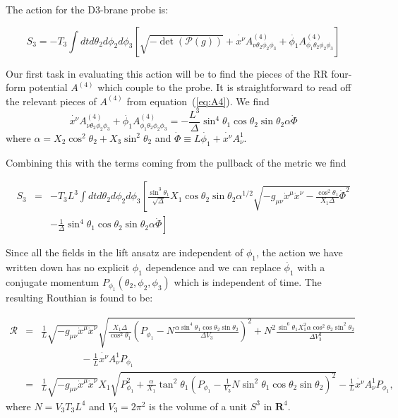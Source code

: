 \documentclass[a4paper,12pt]{article}
\begin{document}
The action for the D3-brane probe is:

\begin{equation}
  S_3  =  -T_3 \int dt d\theta_2 d\phi_2 d\phi_3 \left[  \sqrt{-\det(\mathcal{P}(g))}           + \dot{x^{\nu}} A^{(4)}_{\nu \theta_2 \phi_2 \phi_3}  +  \dot{\phi_1} A^{(4)}_{\phi_1 \theta_2 \phi_2 \phi_3}\right]
 \label{eq: Probeaction}
\end{equation}

Our first task in evaluating this action will be to find the pieces of the RR four-form potential $A^{(4)}$ which couple to the probe.
It is straightforward to read off the relevant pieces of $A^{(4)}$ from equation~(\ref{eq:A4}). We find 
\begin{equation}
   \dot{x^{\nu}} A^{(4)}_{\nu \theta_2 \phi_2 \phi_3}  +  \dot{\phi_1} A^{(4)}_{\phi_1 \theta_2 \phi_2 \phi_3} = - \frac{L^3}{\Delta} \sin^4 \theta_1 \cos \theta_2 \sin \theta_2 \alpha \dot{\Phi}
\end{equation}
where $\alpha =  X_2 \cos ^2 \theta_2 +  X_3 \sin^2 \theta_2$ and
$\dot{{\Phi}} \equiv L\dot{\phi_1} + \dot{x^{\nu}} A_{\nu}^1$.

Combining this with the terms coming from the pullback of the metric we find

\begin{eqnarray}
  S_3  &=&  -T_3 L^3 \int dt d\theta_2 d\phi_2 d\phi_3 \left[ \frac{\sin^3 \theta_1}{\sqrt{\Delta}} X_1 \cos\theta_2 \sin\theta_2 \alpha^{1/2} \sqrt{-g_{\mu\nu}\dot{x}^{\mu}\dot{x}^{\nu} - \frac{\cos^2\theta_1}{X_1 \Delta}\dot{\Phi}^2} \right. \nonumber \\
 & &  \left.  - \frac{1}{\Delta} \sin^4 \theta_1 \cos \theta_2 \sin \theta_2 \alpha \dot{\Phi} \right]
 \label{eq: Probeaction2}
\end{eqnarray}

Since all the fields in the lift ansatz are independent of $\phi_1$, the action
we have written down has no explicit $\phi_1$ dependence and we can replace
$\dot{\phi_1}$ with a conjugate momentum $P_{\phi_1}(\theta_2,\phi_2,\phi_3)$
which is independent of time. The resulting Routhian is found to be:

\begin{eqnarray}
  \mathcal{R} &=& \frac{1}{L} \sqrt{-g_{\mu\nu}\dot{x}^{\mu}\dot{x}^{\nu}} \sqrt{ \frac{ X_1 \Delta}{\cos^2 \theta_1} \left(P_{\phi_1} - N\frac{ \alpha \sin^4 \theta_1 \cos \theta_2 \sin \theta_2}{\Delta V_3} \right)^2 + N^2\frac{ \sin^6 \theta_1 X_1^2 \alpha \cos^2 \theta_2 \sin^2 \theta_2}{\Delta V_3^2}} \nonumber \\
& & \qquad \qquad - \frac{1}{L} \dot{x^{\nu}} A^1_{\nu} P_{\phi_1} \nonumber \\
&=& \frac{1}{L} \sqrt{-g_{\mu\nu}\dot{x}^{\mu}\dot{x}^{\nu}} X_1 \sqrt{ P_{\phi_1}^2 + \frac{\alpha}{X_1} \tan^2 \theta_1 (P_{\phi_1} - \frac{1}{V_3} N\sin^2 \theta_1 \cos \theta_2 \sin \theta_2)^2 } - \frac{1}{L} \dot{x^{\nu}} A^1_{\nu} P_{\phi_1},
\label{Routhian}
\end{eqnarray}
where $N = V_3 T_3 L^4$ and $V_3 = 2\pi^2$ is the volume of a unit $S^3$ in
${\mathbf R}^4$.
\end{document}

